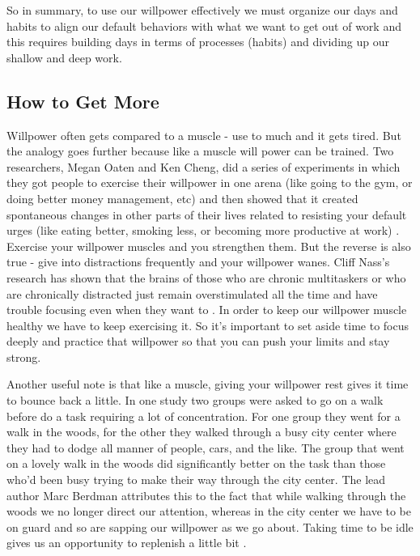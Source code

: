 \documentclass[11pt,a5paper]{book}
\begin{document}
So in summary, to use our willpower effectively we must organize our days and habits to align our default behaviors with what we want to get out of work and this requires building days in terms of processes (habits) and dividing up our shallow and deep work.

\subsection{How to Get More}
Willpower often gets compared to a muscle - use to much and it gets tired. But the analogy goes further because like a muscle will power can be trained. Two researchers, Megan Oaten and Ken Cheng, did a series of experiments in which they got people to exercise their willpower in one arena (like going to the gym, or doing better money management, etc) and then showed that it created spontaneous changes in other parts of their lives related to resisting your default urges (like eating better, smoking less, or becoming more productive at work) \cite{duhigg}. Exercise your willpower muscles and you strengthen them. But the reverse is also true - give into distractions frequently and your willpower wanes. Cliff Nass's research has shown that the brains of those who are chronic multitaskers or who are chronically distracted just remain overstimulated all the time and have trouble focusing even when they want to \cite{newport}. In order to keep our willpower muscle healthy we have to keep exercising it. So it's important to set aside time to focus deeply and practice that willpower so that you can push your limits and stay strong.
\newline

Another useful note is that like a muscle, giving your willpower rest gives it time to bounce back a little. In one study two groups were asked to go on a walk before do a task requiring a lot of concentration. For one group they went for a walk in the woods, for the other they walked through a busy city center where they had to dodge all manner of people, cars, and the like. The group that went on a lovely walk in the woods did significantly better on the task than those who'd been busy trying to make their way through the city center. The lead author Marc Berdman attributes this to the fact that while walking through the woods we no longer direct our attention, whereas in the city center we have to be on guard and so are sapping our willpower as we go about. Taking time to be idle gives us an opportunity to replenish a little bit \cite{newport}.
\newline
\end{document}
